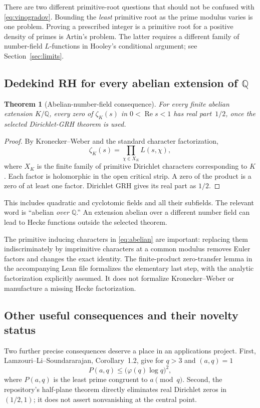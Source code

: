 \documentclass[11pt,letterpaper]{article}
\newtheorem{theorem}{Theorem}[section]
\theoremstyle{definition}\newtheorem{definition}[theorem]{Definition}
\theoremstyle{remark}\newtheorem{remark}[theorem]{Remark}
\newcommand{\Q}{\mathbb Q}\newcommand{\R}{\mathbb R}\newcommand{\C}{\mathbb C}
\newcommand{\re}{\operatorname{Re}}\newcommand{\im}{\operatorname{Im}}
\begin{document}
There are two different primitive-root questions that should not be confused with
\eqref{eq:vinogradov}. Bounding the \emph{least} primitive root as the prime modulus varies is
one problem. Proving a prescribed integer is a primitive root for a positive density of primes
is Artin's problem. The latter requires a different family of number-field $L$-functions in
Hooley's conditional argument; see Section~\ref{sec:limits}.

\subsection{Dedekind RH for every abelian extension of \texorpdfstring{$\Q$}{Q}}
\begin{theorem}[Abelian-number-field consequence]\label{thm:abelian}
For every finite abelian extension $K/\Q$, every zero of $\zeta_K(s)$ in $0<\re s<1$ has
real part~$1/2$, once the selected Dirichlet-GRH theorem is used.
\end{theorem}
\begin{proof}
By Kronecker--Weber and the standard character factorization,
\begin{equation}\label{eq:abelian}
 \zeta_K(s)=\prod_{\chi\in X_K}L(s,\chi),
\end{equation}
where $X_K$ is the finite family of primitive Dirichlet characters corresponding to $K$.
Each factor is holomorphic in the open critical strip. A zero of the product is a zero of at
least one factor. Dirichlet GRH gives its real part as $1/2$.\cite{kw}
\end{proof}

This includes quadratic and cyclotomic fields and all their subfields. The relevant word is
``abelian \emph{over $\Q$}.'' An extension abelian over a different number field can lead to
Hecke functions outside the selected theorem.

The primitive inducing characters in \eqref{eq:abelian} are important: replacing them indiscriminately
by imprimitive characters at a common modulus removes Euler factors and changes the exact identity.
The finite-product zero-transfer lemma in the accompanying Lean file formalizes the elementary
last step, with the analytic factorization explicitly assumed. It does not formalize
Kronecker--Weber or manufacture a missing Hecke factorization.

\subsection{Other useful consequences and their novelty status}
Two further precise consequences deserve a place in an applications project.
First, Lamzouri--Li--Soundararajan, Corollary~1.2, give for $q>3$ and $(a,q)=1$
\[
 P(a,q)\le\bigl(\varphi(q)\log q\bigr)^2,
\]
where $P(a,q)$ is the least prime congruent to $a\pmod q$. Second, the repository's
half-plane theorem directly eliminates real Dirichlet zeros in $(1/2,1)$; it does not assert
nonvanishing at the central point.\cite{lls,statements}
\end{document}

